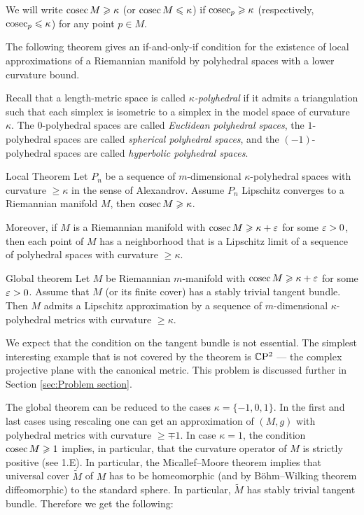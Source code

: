 \documentclass{article}
\begin{document}
We will write $\mathop{\rm cosec}\nolimits M\geqslant \kappa$ (or $\mathop{\rm cosec}\nolimits M\leqslant \kappa$) if $\mathop{\rm cosec}\nolimits_p\geqslant \kappa$ (respectively, $\mathop{\rm cosec}\nolimits_p\leqslant \kappa$) for any point $p\in M$.


The following theorem gives an if-and-only-if condition for the existence of local approximations of a Riemannian manifold by polyhedral spaces with a lower curvature bound.

Recall that a length-metric space is called \emph{$\kappa$-polyhedral} if it admits a triangulation such that each simplex is isometric to a simplex in the model space of curvature $\kappa$.
The $0$-polyhedral spaces are called \emph{Euclidean polyhedral spaces},
the $1$-polyhedral spaces are called \emph{spherical polyhedral spaces},
and
the $(-1)$-polyhedral spaces are called \emph{hyperbolic polyhedral spaces}.

\begin{thm}{Local Theorem}\label{0.1}
Let $P_n$ be a sequence of $m$-dimensional $\kappa$-polyhedral spaces
with curvature $\ge \kappa$ in the sense of Alexandrov.
Assume $P_n$ Lipschitz converges to a Riemannian manifold $M$, then $\mathop{\rm cosec}\nolimits M\geqslant \kappa$.

Moreover, if $M$ is a Riemannian manifold with $\mathop{\rm cosec}\nolimits M\geqslant\kappa+\varepsilon$ for some $\varepsilon>0$,
then each point of $M$ has a neighborhood that is a Lipschitz limit of a sequence of
polyhedral spaces with curvature $\ge \kappa$.
\end{thm}


\begin{thm}{Global theorem}\label{0.2}
Let $M$ be Riemannian $m$-manifold with $\cosec M\z\ge \kappa+\eps$ for some $\varepsilon>0$.
Assume that $M$ (or its finite cover) has a stably trivial tangent bundle.
Then $M$ admits a Lipschitz approximation
by a sequence of $m$-dimensional $\kappa$-polyhedral metrics with curvature
$\ge \kappa$.
\end{thm}

We expect that the condition on the tangent bundle is not essential.
The simplest interesting example that is not covered by the theorem is $\mathbb{C}\mathrm{P}^2$ ---
the complex projective plane with the canonical metric.
This problem is discussed further in Section \ref{sec:Problem section}.

The global theorem can be reduced to the cases $\kappa= \{-1,0,1\}$.
In the first and last cases using rescaling one can get an approximation
of $(M,g)$ with polyhedral metrics with curvature $\ge \mp1$.
In case $\kappa=1$, the condition $\mathop{\rm cosec}\nolimits M\geqslant 1$ implies, in particular, that the curvature operator of $M$ is strictly positive (see 1.E).
In particular, the Micallef--Moore theorem \cite{MM} implies that universal cover $\widetilde M$ of $M$ has to be homeomorphic (and by B\"ohm--Wilking theorem \cite{BW} diffeomorphic) to
the standard sphere.
In particular, $\widetilde M$ has stably trivial tangent bundle.
Therefore we get the following:
\end{document}
